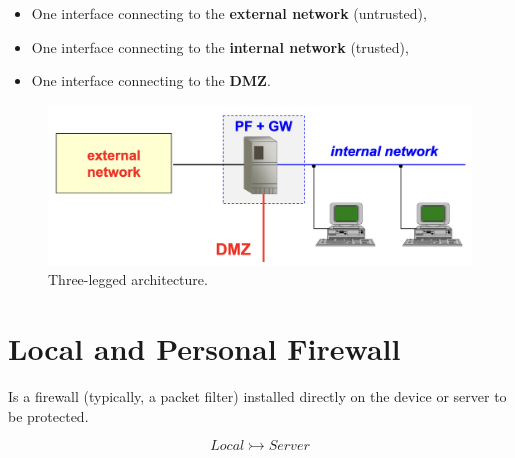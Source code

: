 \begin{multicols}{2}

    
    \begin{itemize}
        \item One interface connecting to the \textbf{external network} (untrusted),
        \item One interface connecting to the \textbf{internal network} (trusted),
        \item One interface connecting to the \textbf{DMZ}.
    \end{itemize}
\columnbreak

    
\begin{figure}[H]
    \centering
    \includegraphics[width=\linewidth]{Images/Firewalling/screened_subnet_v2.png}
    \caption{Three-legged architecture.}
\end{figure}

\end{multicols}









\section{Local and Personal Firewall}
Is a firewall (typically, a packet filter) installed directly on the device or server to be protected.

\[
Local \rightarrowtail Server
\]

